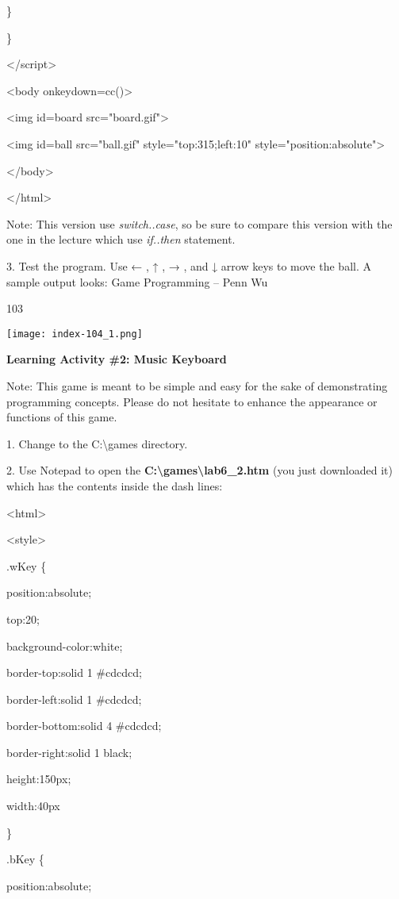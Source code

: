 \documentclass[
]{article}
\begin{document}
\}

\}

\textless/script\textgreater{}

\textless body onkeydown=cc()\textgreater{}

\textless img id=board src="board.gif"\textgreater{}

\textless img id=ball src="ball.gif" style="top:315;left:10"
style="position:absolute"\textgreater{}

\textless/body\textgreater{}

\textless/html\textgreater{}

Note: This version use \emph{switch..case}, so be sure to compare this
version with the one in the lecture which use \emph{if..then} statement.

3. Test the program. Use ← , ↑ , → , and ↓ arrow keys to move the ball.
A sample output looks: Game Programming -- Penn Wu

103

\protect\hypertarget{index_split_007.htmlux5cux23p104}{}{}\texttt{[image: index-104\_1.png]}

\textbf{Learning Activity \#2: Music Keyboard}

Note: This game is meant to be simple and easy for the sake of
demonstrating programming concepts. Please do not hesitate to enhance
the appearance or functions of this game.

1. Change to the C:\textbackslash games directory.

2. Use Notepad to open the
\textbf{C:\textbackslash games\textbackslash lab6\_2.htm} (you just
downloaded it) which has the contents inside the dash lines:

\textless html\textgreater{}

\textless style\textgreater{}

.wKey \{

position:absolute;

top:20;

background-color:white;

border-top:solid 1 \#cdcdcd;

border-left:solid 1 \#cdcdcd;

border-bottom:solid 4 \#cdcdcd;

border-right:solid 1 black;

height:150px;

width:40px

\}

.bKey \{

position:absolute;
\end{document}
